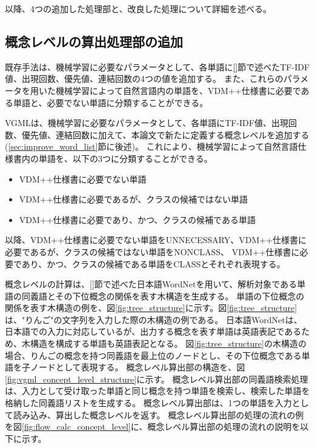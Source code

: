 以降、4つの追加した処理部と、改良した処理について詳細を述べる。

\subsection{概念レベルの算出処理部の追加}
\label{sec:part_calc_concept_level}
既存手法は、機械学習に必要なパラメータとして、各単語に\ref{}節で述べたTF-IDF値、出現回数、優先値、連結回数の4つの値を追加する。
また、これらのパラメータを用いた機械学習によって自然言語内の単語を、VDM++仕様書に必要である単語と、必要でない単語に分類することができる。

VGMLは、機械学習に必要なパラメータとして、各単語にTF-IDF値、出現回数、優先値、連結回数に加えて、本論文で新たに定義する概念レベルを追加する(\ref{sec:improve_word_list}節に後述)。
これにより、機械学習によって自然言語仕様書内の単語を、以下の3つに分類することができる。

\begin{itemize}
    \item VDM++仕様書に必要でない単語
    \item VDM++仕様書に必要であるが、クラスの候補ではない単語
    \item VDM++仕様書に必要であり、かつ、クラスの候補である単語
\end{itemize}

以降、VDM++仕様書に必要でない単語をUNNECESSARY、VDM++仕様書に必要であるが、クラスの候補ではない単語をNONCLASS、
VDM++仕様書に必要であり、かつ、クラスの候補である単語をCLASSとそれぞれ表現する。

概念レベルの計算は、\ref{}節で述べた日本語WordNetを用いて、解析対象である単語の同義語とその下位概念の関係を表す木構造を生成する。
単語の下位概念の関係を表す木構造の例を、図\ref{fig:tree_structure}に示す。図\ref{fig:tree_structure}は、"りんご"の文字列を入力した際の木構造の例である。
日本語WordNetは、日本語での入力に対応しているが、出力する概念を表す単語は英語表記であるため、木構造を構成する単語も英語表記となる。
図\ref{fig:tree_structure}の木構造の場合、りんごの概念を持つ同義語を最上位のノードとし、その下位概念である単語を子ノードとして表現する。
概念レベル算出部の構造を、図\ref{fig:vgml_concept_level_structure}に示す。
概念レベル算出部の同義語検索処理は、入力として受け取った単語と同じ概念を持つ単語を検索し、検索した単語を格納した同義語リストを生成する。
概念レベル算出部は、1つの単語を入力として読み込み、算出した概念レベルを返す。
概念レベル算出部の処理の流れの例を図\ref{fig:flow_calc_concept_level}に、概念レベル算出部の処理の流れの説明を以下に示す。

